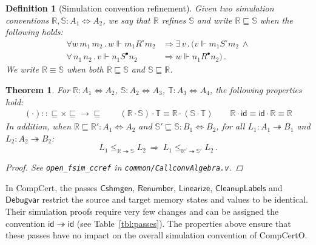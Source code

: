 \documentclass[draft,11pt]{report}
\newtheorem{definition}{Definition}
\newtheorem{theorem}{Theorem}
\newcommand{\kw}[1]{\ensuremath{ \mathsf{#1} }}
\newcommand{\que}{\circ}         %
\newcommand{\ans}{\bullet}       %
\newcommand{\scref}{\sqsubseteq} %
\begin{document}
\begin{definition}[Simulation convention refinement] %
Given two simulation conventions
$\mathbb{R}, \mathbb{S} : A_1 \Leftrightarrow A_2$,
we say that
$\mathbb{R}$ refines $\mathbb{S}$ and write
$\mathbb{R} \scref \mathbb{S}$
when the following holds:
\begin{align*}
  \forall w \, m_1 \, m_2 \,.\,
  w \Vdash m_1 \mathrel{R^\que} m_2 &\Rightarrow
  \exists \, v \,.\, (
  v \Vdash m_1 \mathrel{S^\que} m_2
  \: \wedge \\
  \forall \, n_1 \, n_2 \,.\,
  v \Vdash n_1 \mathrel{S^\ans} n_2 &\Rightarrow
  w \Vdash n_1 \mathrel{R^\ans} n_2) \,.
\end{align*}
We write $\mathbb{R} \equiv \mathbb{S}$ when both
$\mathbb{R} \scref \mathbb{S}$ and
$\mathbb{S} \scref \mathbb{R}$.
\end{definition}

\begin{theorem} %
For
$\mathbb{R} : A_1 \Leftrightarrow A_2$,
$\mathbb{S} : A_2 \Leftrightarrow A_3$,
$\mathbb{T} : A_3 \Leftrightarrow A_4$,
the following properties hold:
\begin{gather*}
  ({\cdot}) :: {{\scref} \times {\scref} \rightarrow {\scref}}
  \qquad
  (\mathbb{R} \cdot \mathbb{S}) \cdot \mathbb{T} \equiv
    \mathbb{R} \cdot (\mathbb{S} \cdot \mathbb{T})
  \qquad
  \mathbb{R} \cdot \kw{id} \equiv
  \kw{id} \cdot \mathbb{R} \equiv
  \mathbb{R}
\end{gather*}
In addition, when
$\mathbb{R} \scref \mathbb{R}' : A_1 \Leftrightarrow A_2$ and
$\mathbb{S}' \scref \mathbb{S} : B_1 \Leftrightarrow B_2$,
for all
$L_1 : A_1 \twoheadrightarrow B_1$ and $L_2 : A_2 \twoheadrightarrow B_2$:
\[
      L_1 \le_{\mathbb{R} \twoheadrightarrow \mathbb{S}} L_2
      \: \Rightarrow \:
      L_1 \le_{\mathbb{R}' \twoheadrightarrow \mathbb{S}'} L_2 \,.
\]
\begin{proof}
See \texttt{open\_fsim\_ccref} in \texttt{common/CallconvAlgebra.v}.
\end{proof}
\end{theorem}

In CompCert,
the passes \kw{Cshmgen}, \kw{Renumber}, \kw{Linearize},
\kw{CleanupLabels} and \kw{Debugvar}
restrict the source and target
memory states and values to be identical.
Their simulation proofs require very few changes
and can be assigned the convention $\kw{id} \twoheadrightarrow \kw{id}$
(see Table~\ref{tbl:passes}).
The properties above ensure that these passes
have no impact on the overall simulation convention
of CompCertO.
\end{document}
